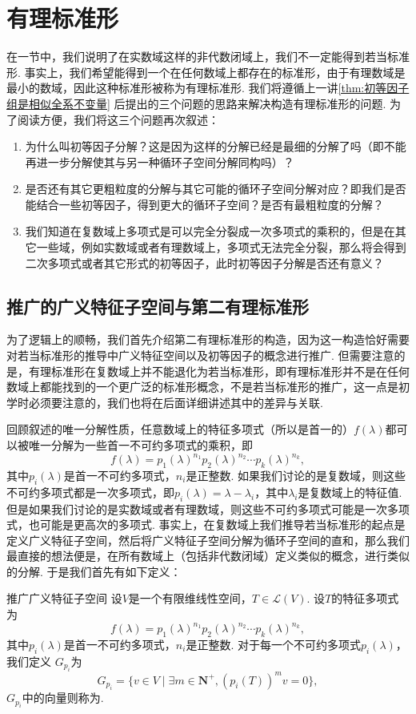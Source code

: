 \chapter{有理标准形}

在一节中，我们说明了在实数域这样的非代数闭域上，我们不一定能得到若当标准形. 事实上，我们希望能得到一个在任何数域上都存在的标准形，由于有理数域是最小的数域，因此这种标准形被称为有理标准形. 我们将遵循上一讲\autoref{thm:初等因子组是相似全系不变量} 后提出的三个问题的思路来解决构造有理标准形的问题. 为了阅读方便，我们将这三个问题再次叙述：
\begin{enumerate}
    \item 为什么叫初等因子分解？这是因为这样的分解已经是最细的分解了吗（即不能再进一步分解使其与另一种循环子空间分解同构吗）？
    \item 是否还有其它更粗粒度的分解与其它可能的循环子空间分解对应？即我们是否能结合一些初等因子，得到更大的循环子空间？是否有最粗粒度的分解？
    \item 我们知道在复数域上多项式是可以完全分裂成一次多项式的乘积的，但是在其它一些域，例如实数域或者有理数域上，多项式无法完全分裂，那么将会得到二次多项式或者其它形式的初等因子，此时初等因子分解是否还有意义？
\end{enumerate}

\section{推广的广义特征子空间与第二有理标准形}
为了逻辑上的顺畅，我们首先介绍第二有理标准形的构造，因为这一构造恰好需要对若当标准形的推导中广义特征空间以及初等因子的概念进行推广. 但需要注意的是，有理标准形在复数域上并不能退化为若当标准形，即有理标准形并不是在任何数域上都能找到的一个更广泛的标准形概念，不是若当标准形的推广，这一点是初学时必须要注意的，我们也将在后面详细讲述其中的差异与关联.

回顾叙述的唯一分解性质，任意数域上的特征多项式（所以是首一的）$f(\lambda)$都可以被唯一分解为一些首一不可约多项式的乘积，即
\[f(\lambda)=p_1(\lambda)^{n_1}p_2(\lambda)^{n_2}\cdots p_k(\lambda)^{n_k},\]
其中$p_i(\lambda)$是首一不可约多项式，$n_i$是正整数. 如果我们讨论的是复数域，则这些不可约多项式都是一次多项式，即$p_i(\lambda)=\lambda-\lambda_i$，其中$\lambda_i$是复数域上的特征值. 但是如果我们讨论的是实数域或者有理数域，则这些不可约多项式可能是一次多项式，也可能是更高次的多项式. 事实上，在复数域上我们推导若当标准形的起点是定义广义特征子空间，然后将广义特征子空间分解为循环子空间的直和，那么我们最直接的想法便是，在所有数域上（包括非代数闭域）定义类似的概念，进行类似的分解. 于是我们首先有如下定义：
\begin{definition}{}{推广广义特征子空间}
    设$V$是一个有限维线性空间，$T\in\mathcal{L}(V)$. 设$T$的特征多项式为
    \[f(\lambda)=p_1(\lambda)^{n_1}p_2(\lambda)^{n_2}\cdots p_k(\lambda)^{n_k},\]
    其中$p_i(\lambda)$是首一不可约多项式，$n_i$是正整数. 对于每一个不可约多项式$p_i(\lambda)$，我们定义 $G_{p_i}$为
    \[G_{p_i}=\{v\in V\mid\exists m\in\mathbf{N}^+,(p_i(T))^mv=0\},\]
    $G_{p_i}$中的向量则称为.
\end{definition}

